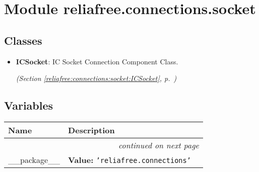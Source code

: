 %
%
%


\section{Module reliafree.connections.socket}

    \label{reliafree:connections:socket}


\subsection{Classes}

\begin{itemize}  \setlength{\parskip}{0ex}
  \item \textbf{ICSocket}: IC Socket Connection Component Class.



  \textit{(Section \ref{reliafree:connections:socket:ICSocket}, p.~\pageref{reliafree:connections:socket:ICSocket})}

\end{itemize}


  \subsection{Variables}

    \vspace{-1cm}
\hspace{\varindent}\begin{longtable}{|p{\varnamewidth}|p{\vardescrwidth}|l}
\cline{1-2}
\cline{1-2} \centering \textbf{Name} & \centering \textbf{Description}& \\
\cline{1-2}
\endhead\cline{1-2}\multicolumn{3}{r}{\small\textit{continued on next page}}\\\endfoot\cline{1-2}
\endlastfoot\raggedright \_\-\_\-p\-a\-c\-k\-a\-g\-e\-\_\-\_\- & \raggedright \textbf{Value:} 
{\tt \texttt{'}\texttt{reliafree.connections}\texttt{'}}&\\
\cline{1-2}
\end{longtable}

